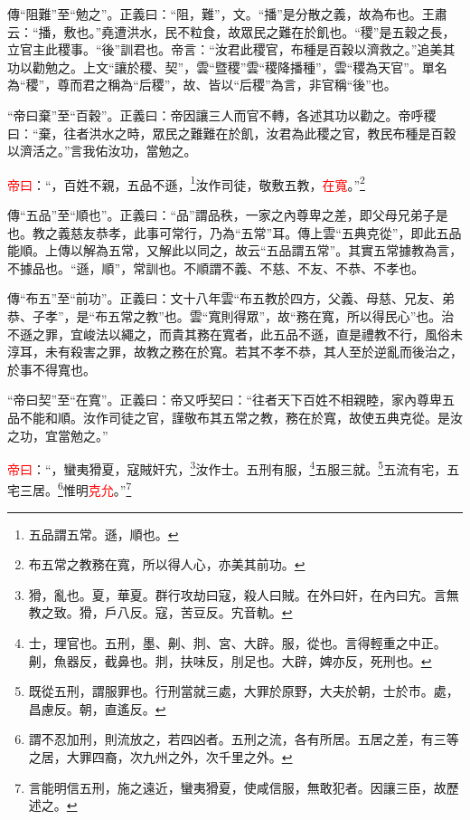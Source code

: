 {\noindent\zhuan{}\fzbyks 傳“阻難”至“勉之”。正義曰：“阻，難”，文。“播”是分散之義，故為布也。王肅云：“播，敷也。”堯遭洪水，民不粒食，故眾民之難在於飢也。“稷”是五穀之長，立官主此稷事。“後”訓君也。帝言：“汝君此稷官，布種是百穀以濟救之。”追美其功以勸勉之。上文“讓於稷、契”，雲“暨稷”雲“稷降播種”，雲“稷為天官”。單名為“稷”，尊而君之稱為“后稷”，故、皆以“后稷”為言，非官稱“後”也。 \par}

{\noindent\shu{}\fzkt “帝曰棄”至“百穀”。正義曰：帝因讓三人而官不轉，各述其功以勸之。帝呼稷曰：“棄，往者洪水之時，眾民之難難在於飢，汝君為此稷之官，教民布種是百穀以濟活之。”言我佑汝功，當勉之。 \par}

\textcolor{red}{帝曰}：“，百姓不親，五品不遜，\footnote{五品謂五常。遜，順也。}汝作司徒，敬敷五教，\textcolor{red}{在寬}。”\footnote{布五常之教務在寬，所以得人心，亦美其前功。}

{\noindent\zhuan{}\fzbyks 傳“五品”至“順也”。正義曰：“品”謂品秩，一家之內尊卑之差，即父母兄弟子是也。教之義慈友恭孝，此事可常行，乃為“五常”耳。傳上雲“五典克從”，即此五品能順。上傳以解為五常，又解此以同之，故云“五品謂五常”。其實五常據教為言，不據品也。“遜，順”，常訓也。不順謂不義、不慈、不友、不恭、不孝也。 \par}

{\noindent\zhuan{}\fzbyks 傳“布五”至“前功”。正義曰：文十八年雲“布五教於四方，父義、母慈、兄友、弟恭、子孝”，是“布五常之教”也。雲“寬則得眾”，故“務在寬，所以得民心”也。治不遜之罪，宜峻法以繩之，而貴其務在寬者，此五品不遜，直是禮教不行，風俗未淳耳，未有殺害之罪，故教之務在於寬。若其不孝不恭，其人至於逆亂而後治之，於事不得寬也。 \par}

{\noindent\shu{}\fzkt “帝曰契”至“在寬”。正義曰：帝又呼契曰：“往者天下百姓不相親睦，家內尊卑五品不能和順。汝作司徒之官，謹敬布其五常之教，務在於寬，故使五典克從。是汝之功，宜當勉之。” \par}

\textcolor{red}{帝曰}：“，蠻夷猾夏，寇賊奸宄，\footnote{猾，亂也。夏，華夏。群行攻劫曰寇，殺人曰賊。在外曰奸，在內曰宄。言無教之致。猾，戶八反。寇，苦豆反。宄音軌。}汝作士。五刑有服，\footnote{士，理官也。五刑，墨、劓、剕、宮、大辟。服，從也。言得輕重之中正。劓，魚器反，截鼻也。剕，扶味反，刖足也。大辟，婢亦反，死刑也。}五服三就。\footnote{既從五刑，謂服罪也。行刑當就三處，大罪於原野，大夫於朝，士於市。處，昌慮反。朝，直遙反。}五流有宅，五宅三居。\footnote{謂不忍加刑，則流放之，若四凶者。五刑之流，各有所居。五居之差，有三等之居，大罪四裔，次九州之外，次千里之外。}惟明\textcolor{red}{克允}。”\footnote{言能明信五刑，施之遠近，蠻夷猾夏，使咸信服，無敢犯者。因讓三臣，故歷述之。}

